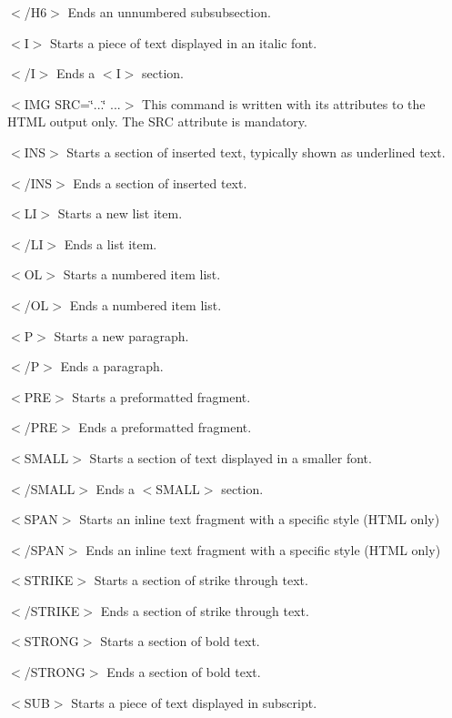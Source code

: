 \begin{DoxyItemize}
\item {\ttfamily $<$/\+H6$>$} Ends an unnumbered subsubsection. 
\item {\ttfamily $<$I$>$} Starts a piece of text displayed in an italic font. 
\item {\ttfamily $<$/I$>$} Ends a {\ttfamily $<$I$>$} section. 
\item {\ttfamily $<$I\+MG S\+RC=\char`\"{}...\char`\"{} ...$>$} This command is written with its attributes to the H\+T\+ML output only. The S\+RC attribute is mandatory. 
\item {\ttfamily $<$I\+NS$>$} Starts a section of inserted text, typically shown as underlined text. 
\item {\ttfamily $<$/\+I\+NS$>$} Ends a section of inserted text. 
\item {\ttfamily $<$LI$>$} Starts a new list item. 
\item {\ttfamily $<$/\+LI$>$} Ends a list item. 
\item {\ttfamily $<$OL$>$} Starts a numbered item list. 
\item {\ttfamily $<$/\+OL$>$} Ends a numbered item list. 
\item {\ttfamily $<$P$>$} Starts a new paragraph. 
\item {\ttfamily $<$/P$>$} Ends a paragraph. 
\item {\ttfamily $<$P\+RE$>$} Starts a preformatted fragment. 
\item {\ttfamily $<$/\+P\+RE$>$} Ends a preformatted fragment. 
\item {\ttfamily $<$S\+M\+A\+LL$>$} Starts a section of text displayed in a smaller font. 
\item {\ttfamily $<$/\+S\+M\+A\+LL$>$} Ends a {\ttfamily $<$S\+M\+A\+LL$>$} section. 
\item {\ttfamily $<$S\+P\+AN$>$} Starts an inline text fragment with a specific style (H\+T\+ML only) 
\item {\ttfamily $<$/\+S\+P\+AN$>$} Ends an inline text fragment with a specific style (H\+T\+ML only) 
\item {\ttfamily $<$S\+T\+R\+I\+KE$>$} Starts a section of strike through text. 
\item {\ttfamily $<$/\+S\+T\+R\+I\+KE$>$} Ends a section of strike through text. 
\item {\ttfamily $<$S\+T\+R\+O\+NG$>$} Starts a section of bold text. 
\item {\ttfamily $<$/\+S\+T\+R\+O\+NG$>$} Ends a section of bold text. 
\item {\ttfamily $<$S\+UB$>$} Starts a piece of text displayed in subscript. 

\end{DoxyItemize}
